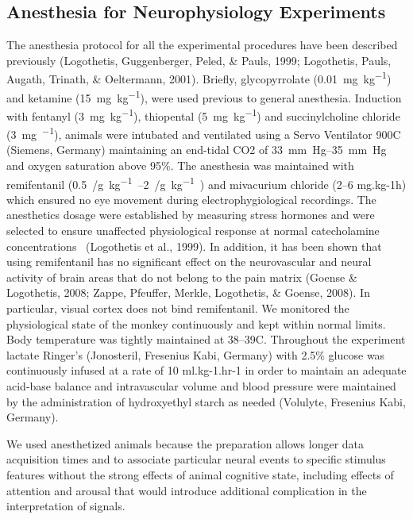 \subsection{Anesthesia for Neurophysiology Experiments}
The anesthesia protocol for all the experimental procedures have been described previously (Logothetis, Guggenberger, Peled, \& Pauls, 1999; Logothetis, Pauls, Augath, Trinath, \& Oeltermann, 2001).
Briefly, glycopyrrolate (\SI{0.01}{mg.{kg}^{-1}}) and ketamine (\SI{15}{mg.{kg}^{-1}}), were used previous to general anesthesia.
Induction with fentanyl (\SI{3}{mg.{kg}^{-1}}), thiopental (\SI{5}{mg.{kg}^{-1}}) and succinylcholine chloride (\SI{3}{mg^{-1}}), animals were intubated and ventilated using a Servo Ventilator 900C (Siemens, Germany) maintaining an end-tidal CO2 of \SIrange{33}{35}{mm.Hg} and oxygen saturation above 95\%.
The anesthesia was maintained with remifentanil (\SIrange{0.5}{2}{\mu/g.kg^{-1}.\min}) and mivacurium chloride (2--6 mg.kg{}-1h) which ensured no eye movement during electrophygiological recordings.
The anesthetics dosage were established by measuring stress hormones and were selected to ensure unaffected physiological response at normal catecholamine concentrations \ (Logothetis et al., 1999).
In addition, it has been shown that using remifentanil has no significant effect on the neurovascular and neural activity of brain areas that do not belong to the pain matrix (Goense \& Logothetis, 2008; Zappe, Pfeuffer, Merkle, Logothetis, \& Goense, 2008).
In particular, visual cortex does not bind remifentanil.
We monitored the physiological state of the monkey continuously and kept within normal limits.
Body temperature was tightly maintained at 38--39{\textdegree}C.
Throughout the experiment lactate Ringer's (Jonosteril, Fresenius Kabi, Germany) with 2.5\% glucose was continuously infused at a rate of 10 ml.kg{}-1.hr{}-1 in order to maintain an adequate acid-base balance and intravascular volume and blood pressure were maintained by the administration of hydroxyethyl starch as needed (Volulyte, Fresenius Kabi, Germany).


We used anesthetized animals because the preparation allows longer data acquisition times and to associate particular neural events to specific stimulus features without the strong effects of animal cognitive state, including effects of attention and arousal that would introduce additional complication in the interpretation of signals.


